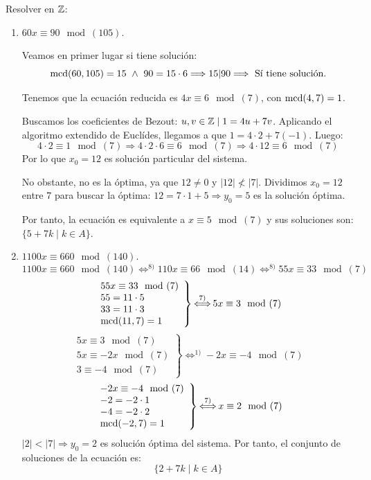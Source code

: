 \begin{ejemplo} Resolver en $\mathbb Z$:
\begin{enumerate}
    \item $60x\equiv 90\mod(105)$.

    Veamos en primer lugar si tiene solución: 
    $$\operatorname{mcd}(60,105)=15 \ \land \  90 = 15 \cdot 6 \Longrightarrow 15|90 \Longrightarrow \text{ Sí tiene solución.}$$

    Tenemos que la ecuación reducida es $ 4x\equiv 6\mod(7)$, con $\operatorname{mcd}(4,7) = 1$.

    Buscamos los coeficientes de Bezout: $u,v \in \mathbb Z \mid 1=4u + 7v$. Aplicando el algoritmo extendido de Euclídes, llegamos a que $1 = 4\cdot 2 + 7(-1)$. Luego:
    $$4\cdot 2\equiv 1\mod(7) \Longrightarrow 4 \cdot 2 \cdot 6\equiv 6\mod(7) \Longrightarrow 4\cdot 12\equiv 6\mod(7)$$
    Por lo que $x_0=12$ es solución particular del sistema.
    
    No obstante, no es la óptima, ya que  $12\neq 0$ y $|12| \not < |7|$. Dividimos $x_0=12$ entre $7$ para buscar la óptima: $12=7\cdot 1 + 5 \Longrightarrow y_0=5$ es la solución óptima.
        
    Por tanto, la ecuación es equivalente a $x\equiv 5\mod(7)$ y sus soluciones son: $\{5+7k \mid k \in A\}$.

    \item $1100x\equiv 660\mod(140)$.
    $$1100x\equiv 660\mod(140) \mathop{\Longleftrightarrow}^{8)} 110x\equiv 66\mod(14)
        \mathop{\Longleftrightarrow}^{8)} 55x\equiv 33\mod(7)$$
    $$\left. \begin{array}{l}
            55x\equiv 33\mod(7) \\
            55 = 11\cdot 5      \\
            33 = 11\cdot 3      \\
            \operatorname{mcd}(11,7) = 1
        \end{array} \right\} \mathop{\Longleftrightarrow}^{7)} 5x\equiv 3\mod(7)$$
    $$\left. \begin{array}{l}
            5x\equiv 3\mod(7)   \\
            5x\equiv -2x\mod(7) \\
            3\equiv -4\mod(7)
        \end{array} \right\} \mathop{\Longleftrightarrow}^{1)} -2x\equiv -4\mod(7)$$
    $$\left. \begin{array}{l}
            -2x\equiv -4\mod(7) \\
            -2 = -2 \cdot 1     \\
            -4 = -2 \cdot 2     \\
            \operatorname{mcd}(-2,7)=1
        \end{array}\right\} \mathop{\Longleftrightarrow}^{7)} x\equiv 2 \mod(7)$$
    $|2|<|7| \Longrightarrow y_0=2$ es solución óptima del sistema. Por tanto, el conjunto de soluciones de la ecuación es:
    $$\{2 + 7k \mid k \in A\}$$


\end{enumerate}
\end{ejemplo}
